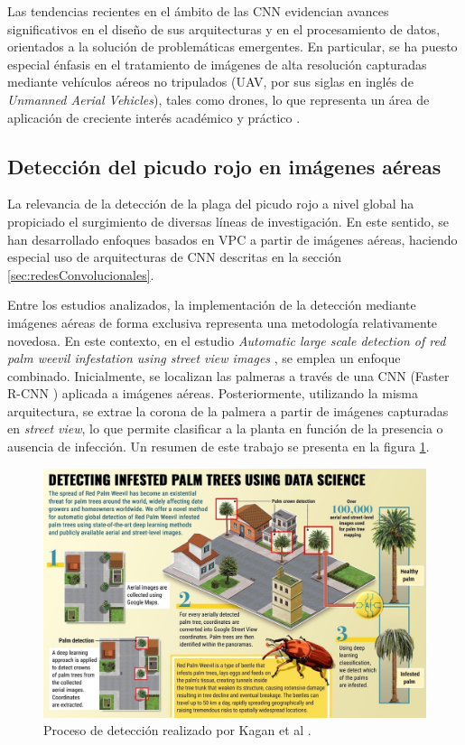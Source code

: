 Las tendencias recientes en el ámbito de las CNN evidencian avances significativos en el diseño de sus arquitecturas y en el procesamiento de datos, orientados a la solución de problemáticas emergentes. En particular, se ha puesto especial énfasis en el tratamiento de imágenes de alta resolución capturadas mediante vehículos aéreos no tripulados (UAV, por sus siglas en inglés de \textit{Unmanned Aerial Vehicles}), tales como drones, lo que representa un área de aplicación de creciente interés académico y práctico \citep{gao_recent_2024} \citep{sutar_convolutional_2025}.

\subsection{Detección del picudo rojo en imágenes aéreas}

La relevancia de la detección de la plaga del picudo rojo a nivel global ha propiciado el surgimiento de diversas líneas de investigación. En este sentido, se han desarrollado enfoques basados en VPC a partir de imágenes aéreas, haciendo especial uso de arquitecturas de CNN descritas en la sección \ref{sec:redesConvolucionales}.

Entre los estudios analizados, la implementación de la detección mediante imágenes aéreas de forma exclusiva representa una metodología relativamente novedosa. En este contexto, en el estudio \textit{Automatic large scale detection of red palm weevil infestation using street view images} \citep{kagan_automatic_2021}, se emplea un enfoque combinado. Inicialmente, se localizan las palmeras a través de una CNN (Faster R-CNN \citep{ren_faster_2016}) aplicada a imágenes aéreas. Posteriormente, utilizando la misma arquitectura, se extrae la corona de la palmera a partir de imágenes capturadas en \textit{street view}, lo que permite clasificar a la planta en función de la presencia o ausencia de infección. Un resumen de este trabajo se presenta en la figura \ref{fig:kagan-automatic-2021-process}.

\begin{figure}[htpb]
  \centering
  \includegraphics[scale=1.8]{./Figures/kagan_automatic_2021-process.jpg}
  \caption{Proceso de detección realizado por Kagan et al \protect\footnotemark.}
  \label{fig:kagan-automatic-2021-process}
\end{figure}

